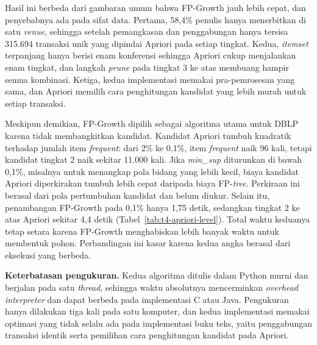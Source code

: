 Hasil ini berbeda dari gambaran umum bahwa FP-Growth jauh lebih cepat, dan penyebabnya ada pada sifat data. Pertama, 58,4\% penulis hanya menerbitkan di satu \textit{venue}, sehingga setelah pemangkasan dan penggabungan hanya tersisa 315.694 transaksi unik yang dipindai Apriori pada setiap tingkat. Kedua, \textit{itemset} terpanjang hanya berisi enam konferensi sehingga Apriori cukup menjalankan enam tingkat, dan langkah \textit{prune} pada tingkat 3 ke atas membuang hampir semua kombinasi. Ketiga, kedua implementasi memakai pra-pemrosesan yang sama, dan Apriori memilih cara penghitungan kandidat yang lebih murah untuk setiap transaksi.

Meskipun demikian, FP-Growth dipilih sebagai algoritma utama untuk DBLP karena tidak membangkitkan kandidat. Kandidat Apriori tumbuh kuadratik terhadap jumlah item \textit{frequent}: dari 2\% ke 0,1\%, item \textit{frequent} naik 96 kali, tetapi kandidat tingkat 2 naik sekitar 11.000 kali. Jika \textit{min\_sup} diturunkan di bawah 0,1\%, misalnya untuk menangkap pola bidang yang lebih kecil, biaya kandidat Apriori diperkirakan tumbuh lebih cepat daripada biaya FP-\textit{tree}. Perkiraan ini berasal dari pola pertumbuhan kandidat dan belum diukur. Selain itu, penambangan FP-Growth pada 0,1\% hanya 1,75 detik, sedangkan tingkat 2 ke atas Apriori sekitar 4,4 detik (Tabel~\ref{tab:t4-apriori-level}). Total waktu keduanya tetap setara karena FP-Growth menghabiskan lebih banyak waktu untuk membentuk pohon. Perbandingan ini kasar karena kedua angka berasal dari eksekusi yang berbeda.

\textbf{Keterbatasan pengukuran.} Kedua algoritma ditulis dalam Python murni dan berjalan pada satu \textit{thread}, sehingga waktu absolutnya mencerminkan \textit{overhead} \textit{interpreter} dan dapat berbeda pada implementasi C atau Java. Pengukuran hanya dilakukan tiga kali pada satu komputer, dan kedua implementasi memakai optimasi yang tidak selalu ada pada implementasi buku teks, yaitu penggabungan transaksi identik serta pemilihan cara penghitungan kandidat pada Apriori.
